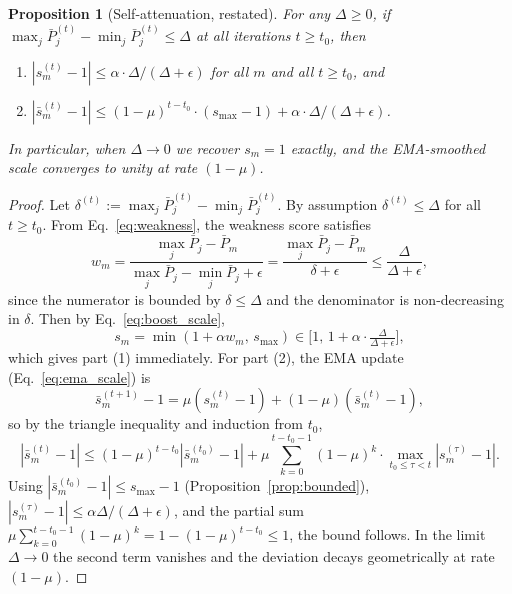 \documentclass{article} %
\newtheorem{proposition}{Proposition}
\begin{document}
\begin{proposition}[Self-attenuation, restated]
For any $\Delta \geq 0$, if $\max_j \bar{P}_j^{(t)} - \min_j \bar{P}_j^{(t)} \leq \Delta$ at all iterations $t \geq t_0$, then
\begin{enumerate}
    \item $|s_m^{(t)} - 1| \leq \alpha \cdot \Delta / (\Delta + \epsilon)$ for all $m$ and all $t \geq t_0$, and
    \item $|\bar{s}_m^{(t)} - 1| \leq (1 - \mu)^{t - t_0} \cdot (s_{\max} - 1) + \alpha \cdot \Delta / (\Delta + \epsilon)$.
\end{enumerate}
In particular, when $\Delta \to 0$ we recover $s_m = 1$ exactly, and the EMA-smoothed scale converges to unity at rate $(1-\mu)$.
\end{proposition}

\begin{proof}
Let $\delta^{(t)} := \max_j \bar{P}_j^{(t)} - \min_j \bar{P}_j^{(t)}$. By assumption $\delta^{(t)} \leq \Delta$ for all $t \geq t_0$. From Eq.~\eqref{eq:weakness}, the weakness score satisfies
\begin{equation*}
w_m = \frac{\max_j \bar{P}_j - \bar{P}_m}{\max_j \bar{P}_j - \min_j \bar{P}_j + \epsilon} = \frac{\max_j \bar{P}_j - \bar{P}_m}{\delta + \epsilon} \leq \frac{\Delta}{\Delta + \epsilon},
\end{equation*}
since the numerator is bounded by $\delta \leq \Delta$ and the denominator is non-decreasing in $\delta$. Then by Eq.~\eqref{eq:boost_scale},
\begin{equation*}
s_m = \min(1 + \alpha w_m,\, s_{\max}) \in \bigl[1,\, 1 + \alpha \cdot \tfrac{\Delta}{\Delta + \epsilon}\bigr],
\end{equation*}
which gives part (1) immediately. For part (2), the EMA update (Eq.~\eqref{eq:ema_scale}) is
\begin{equation*}
\bar{s}_m^{(t+1)} - 1 = \mu (s_m^{(t)} - 1) + (1 - \mu)(\bar{s}_m^{(t)} - 1),
\end{equation*}
so by the triangle inequality and induction from $t_0$,
\begin{equation*}
|\bar{s}_m^{(t)} - 1| \leq (1-\mu)^{t - t_0} |\bar{s}_m^{(t_0)} - 1| + \mu \sum_{k=0}^{t - t_0 - 1} (1-\mu)^k \cdot \max_{t_0 \leq \tau < t} |s_m^{(\tau)} - 1|.
\end{equation*}
Using $|\bar{s}_m^{(t_0)} - 1| \leq s_{\max} - 1$ (Proposition~\ref{prop:bounded}), $|s_m^{(\tau)} - 1| \leq \alpha \Delta / (\Delta + \epsilon)$, and the partial sum $\mu \sum_{k=0}^{t-t_0-1} (1-\mu)^{k} = 1 - (1-\mu)^{t-t_0} \leq 1$, the bound follows. In the limit $\Delta \to 0$ the second term vanishes and the deviation decays geometrically at rate $(1-\mu)$.
\end{proof}
\end{document}
